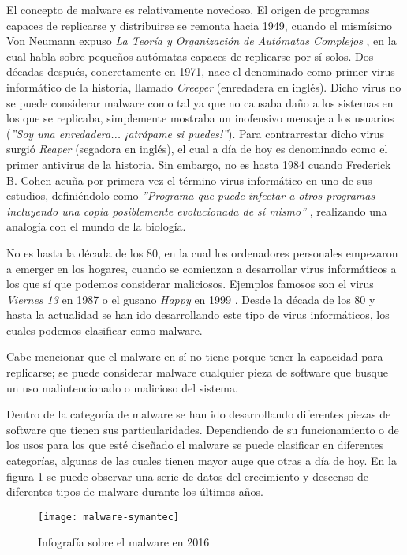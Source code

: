El concepto de malware es relativamente novedoso. El origen de programas capaces de replicarse y distribuirse se remonta hacia 1949, cuando el mismísimo Von Neumann expuso \emph{La Teoría y Organización de Autómatas Complejos} \cite{von-neumann}, en la cual habla sobre pequeños autómatas capaces de replicarse por sí solos. Dos décadas después, concretamente en 1971, nace el denominado como primer virus informático de la historia, llamado \emph{Creeper} \cite{creeper} (enredadera en inglés).  Dicho virus no se puede considerar malware como tal ya que no causaba daño a los sistemas en los que se replicaba, simplemente mostraba un inofensivo mensaje a los usuarios (\textsl{''Soy una enredadera... ¡atrápame si puedes!''}). Para contrarrestar dicho virus surgió \emph{Reaper} (segadora en inglés), el cual a día de hoy es denominado como el primer antivirus de la historia. Sin embargo, no es hasta 1984 cuando Frederick B. Cohen acuña por primera vez el término virus informático en uno de sus estudios, definiéndolo como \emph{''Programa que puede infectar a otros programas incluyendo una copia posiblemente evolucionada de sí mismo''} \cite{panda-virus-history}, realizando una analogía con el mundo de la biología.

No es hasta la década de los 80, en la cual los ordenadores personales empezaron a emerger en los hogares, cuando se comienzan a desarrollar virus informáticos a los que sí que podemos considerar maliciosos. Ejemplos famosos son el virus \emph{Viernes 13} en 1987 o el gusano \emph{Happy} en 1999 \cite{panda-virus-history}. Desde la década de los 80 y hasta la actualidad se han ido desarrollando este tipo de virus informáticos, los cuales podemos clasificar como malware.

Cabe mencionar que el malware en sí no tiene porque tener la capacidad para replicarse; se puede considerar malware cualquier pieza de software que busque un uso malintencionado o malicioso del sistema.

Dentro de la categoría de malware se han ido desarrollando diferentes piezas de software que tienen sus particularidades. Dependiendo de su funcionamiento o de los usos para los que esté diseñado el malware se puede clasificar en diferentes categorías, algunas de las cuales tienen mayor auge que otras a día de hoy. En la figura \ref{fig:malware-symantec} se puede observar una serie de datos del crecimiento y descenso de diferentes tipos de malware durante los últimos años.

\begin{figure}[H]
	\centering
	\texttt{[image: malware-symantec]}
	\caption{Infografía sobre el malware en 2016 \cite{malware-symantec}}
	\label{fig:malware-symantec}
\end{figure}

